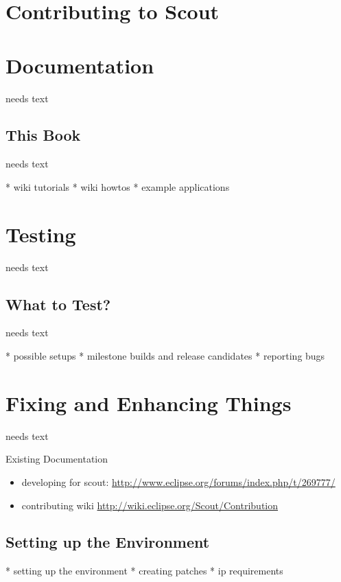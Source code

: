 \documentclass[a4paper,10pt,twoside]{book}
\begin{document}
  \sloppy
\fi


\chapter{Contributing to Scout}

\chapter{Documentation}
needs text

\section{This Book}
needs text

  * wiki tutorials
  * wiki howtos
  * example applications

\chapter{Testing}
needs text

\section{What to Test?}
needs text

  * possible setups
  * milestone builds and release candidates
  * reporting bugs
  
\chapter{Fixing and Enhancing Things}
needs text

\noindent Existing Documentation
\begin{itemize}
  \item developing for scout: \url{http://www.eclipse.org/forums/index.php/t/269777/}
  \item contributing wiki \url{http://wiki.eclipse.org/Scout/Contribution}
\end{itemize}

\section{Setting up the Environment}
  * setting up the environment
  * creating patches
  * ip requirements


\ifx\wholebook\relax\else
   
   
\end{document}
